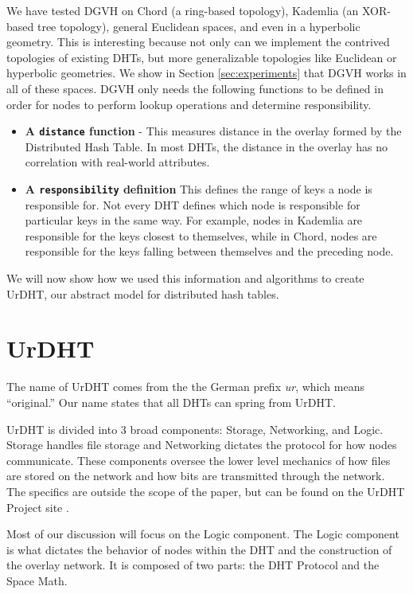 \documentclass[11pt,conference]{IEEEtran}
\begin{document}
We have tested DGVH on Chord (a ring-based topology), Kademlia (an XOR-based tree topology), general Euclidean spaces, and even in a hyperbolic geometry.
This is interesting because not only can we implement the contrived topologies of existing DHTs, but more generalizable topologies like Euclidean or hyperbolic geometries.
We show in Section \ref{sec:experiments} that DGVH works in all of these spaces.
DGVH only needs the following functions to be defined in order for nodes to perform lookup operations and determine responsibility.


\begin{itemize}
	\item \textbf{A \texttt{distance} function } - This measures distance in the overlay formed by the Distributed Hash Table.
	In most DHTs, the distance in the overlay has no correlation with real-world attributes.
	
	\item \textbf{A \texttt{responsibility} definition}  This defines the range of keys a node is responsible for. 
	Not every DHT defines which node is responsible for particular keys in the same way. 
	For example, nodes in Kademlia are responsible for the keys closest to themselves, while in Chord, nodes are responsible for the keys falling between themselves and the preceding node.
\end{itemize}

We will now show how we used this information and algorithms to create UrDHT, our abstract model for  distributed hash tables.




\section{UrDHT}
\label{sec:urdht}


The name of UrDHT comes from the the German prefix \textit{ur}, which means ``original.'' 
Our name states that all DHTs can spring from UrDHT.

UrDHT is divided into 3 broad components: Storage, Networking, and Logic.
Storage handles file storage and Networking dictates the protocol for how nodes communicate.
These components oversee the lower level mechanics of how files are stored on the network and how bits are transmitted through the network.
The specifics are outside the scope of the paper, but can be found on the UrDHT Project site \cite{urdht}.

Most of our discussion will focus on the Logic component.
The Logic component is what dictates the behavior of nodes within the DHT and the construction of the overlay network.
It is composed of two parts: the DHT Protocol and the Space Math.
\end{document}
